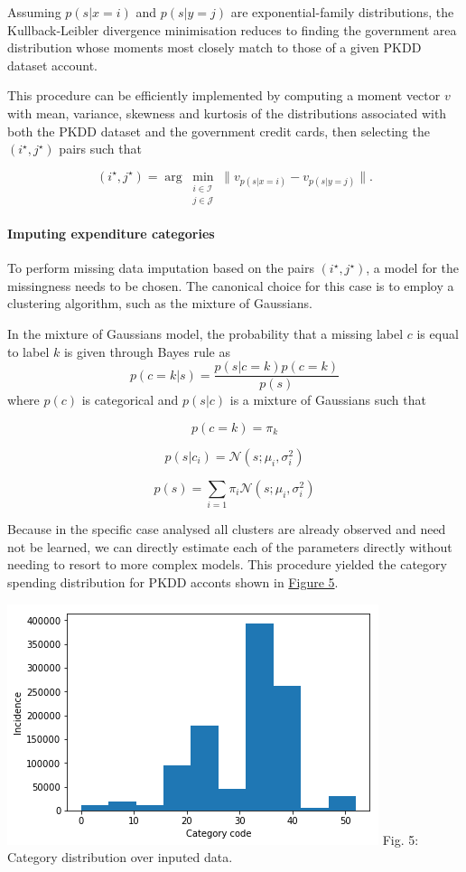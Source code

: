 \documentclass[]{article}
\begin{document}
Assuming \(p(s|x=i)\) and \(p(s|y=j)\) are exponential-family
distributions, the Kullback-Leibler divergence minimisation reduces to
finding the government area distribution whose moments most closely
match to those of a given PKDD dataset account.

This procedure can be efficiently implemented by computing a moment
vector \(v\) with mean, variance, skewness and kurtosis of the
distributions associated with both the PKDD dataset and the government
credit cards, then selecting the \((i^{\star}, j^{\star})\) pairs such
that

\[
   (i^{\star}, j^{\star}) = \arg\min_{\substack{i\in \mathcal{I}\\ j\in \mathcal{J}}}
    \big\|
        v_{p(s|x=i)} - v_{p(s|y=j)}
    \big\|.
\]

\paragraph{Imputing expenditure
categories}\label{imputing-expenditure-categories}

To perform missing data imputation based on the pairs
\((i^{\star}, j^{\star})\), a model for the missingness needs to be
chosen. The canonical choice for this case is to employ a clustering
algorithm, such as the mixture of Gaussians.

In the mixture of Gaussians model, the probability that a missing label
\(c\) is equal to label \(k\) is given through Bayes rule as
\[p(c=k|s) = \frac{p(s|c=k)p(c=k)}{p(s)}\] where \(p(c)\) is categorical
and \(p(s|c)\) is a mixture of Gaussians such that

\[ p(c = k)= \pi_{k} \]

\[ p(s|c_{i}) = \mathcal{N}(s; \mu_{i}, \sigma_{i}^{2}) \]

\[ p(s) = \sum_{i=1} \pi_{i} \mathcal{N}(s; \mu_{i}, \sigma_{i}^{2}) \]

Because in the specific case analysed all clusters are already observed
and need not be learned, we can directly estimate each of the parameters
directly without needing to resort to more complex models. This
procedure yielded the category spending distribution for PKDD acconts
shown in \href{fig-matching-cats}{Figure 5}.

\includegraphics{uploads/upload_de507def2e1d259af1edaaf5812ca5ae.png}
Fig. 5: Category distribution over inputed data.
\end{document}
